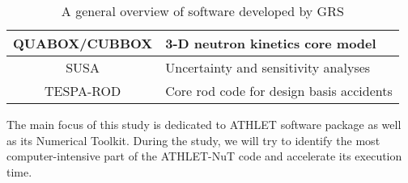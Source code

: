 \begin{table}[htb]
\begin{tabular}{|c|l|}
QUABOX/CUBBOX & 3-D neutron kinetics core model                                                                                                                                                              \\ \hline
SUSA          & Uncertainty and sensitivity analyses                                                                                                                                                         \\ \hline
TESPA-ROD     & Core rod code for design basis accidents                                                                                                                                                     \\ \hline
\end{tabular}
\caption{A general overview of software developed by GRS \cite{grs:grs-general-info}}
\label{table:introduction-grs-software}
\end{table}



The main focus of this study is dedicated to ATHLET software package as well as its Numerical Toolkit. During the study, we will try to identify the most computer-intensive part of the ATHLET-NuT code and accelerate its execution time.\\

